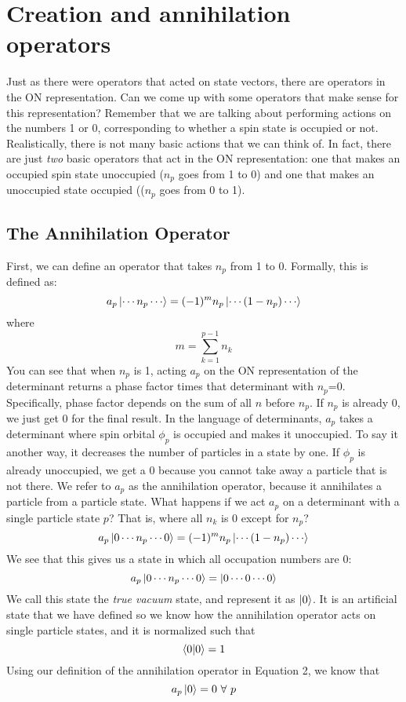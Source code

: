 \documentclass{article}
\begin{document}
\section{Creation and annihilation operators}
Just as there were operators that acted on state vectors, there are operators in the ON representation. 
Can we come up with some operators that make sense for this representation? 
Remember that we are talking about performing actions on the numbers 1 or 0, corresponding to whether a spin state is occupied or not. 
Realistically, there is not many basic actions that we can think of. 
In fact, there are just \textit{two} basic operators that act in the ON representation:
one that makes an occupied spin state unoccupied ($n_p$ goes from 1 to 0) and one that makes an unoccupied state occupied (($n_p$ goes from 0 to 1). 

\subsection{The Annihilation Operator} 
First, we can define an operator that takes $n_p$ from 1 to 0.
Formally, this is defined as: 
\begin{equation}
a_p \ket{\cdots n_p \cdots} = (-1)^{m} n_p \ket{\cdots (1-n_p) \cdots} 
\end{equation}
where 
\[m = \sum_{k=1}^{p-1} n_k \]
You can see that when $n_p$ is 1, acting $a_p$ on the ON representation of the determinant returns a phase factor times that determinant with $n_p$=0. 
Specifically, phase factor depends on the sum of all $n$ before $n_p$. 
If $n_p$ is already 0, we just get 0 for the final result. 
In the language of determinants, $a_p$ takes a determinant where spin orbital $\phi_p$ is occupied and makes it unoccupied. 
To say it another way, it decreases the number of particles in a state by one. 
If $\phi_p$ is already unoccupied, we get a 0 because you cannot take away a particle that is not there.
We refer to $a_p$ as the annihilation operator, because it annihilates a particle from a particle state. 
What happens if we act $a_p$ on a determinant with a single particle state $p$? 
That is, where all $n_k$ is 0 except for $n_p$? 
\[a_p \ket{0 \cdots n_p \cdots0} = (-1)^{m} n_p \ket{\cdots (1-n_p) \cdots}  \]
We see that this gives us a state in which all occupation numbers are 0:
\[a_p \ket{0 \cdots n_p \cdots0} = \ket{0 \cdots 0 \cdots 0}  \]
We call this state the \textit{true vacuum} state, and represent it as $\ket{0}$. 
It is an artificial state that we have defined so we know how the annihilation operator acts on single particle states, and it is normalized such that 
\[\braket{0 | 0} = 1\]
Using our definition of the annihilation operator in Equation 2, we know that 
\[a_p \ket{0} = 0 \,  \, \forall \, \, p \]
\end{document}
